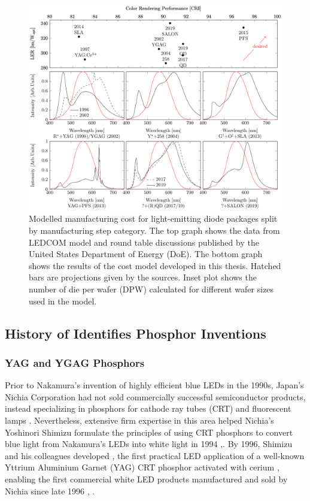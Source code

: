 \documentclass[10pt]{article}
\begin{document}
\begin{figure}[h]
	\centering
    \includegraphics[width=\textwidth]{2_SSL_EES/article/figures/phosphor_spectrum-comparison.pdf}
	\caption{Modelled manufacturing cost for light-emitting diode packages split by manufacturing step category. The top graph shows the data from LEDCOM model and round table discussions published by the United States Department of Energy (DoE). The bottom graph shows the results of the cost model developed in this thesis. Hatched bars are projections given by the sources. Inset plot shows the number of die per wafer (DPW) calculated for different wafer sizes used in the model.}
	\label{fig:phosphor_spectrum}
\end{figure}

\subsection{History of Identifies Phosphor Inventions}

\subsubsection{YAG and YGAG Phosphors}

Prior to Nakamura’s invention of highly efficient blue LEDs in the 1990s, Japan’s Nichia Corporation had not sold commercially successful semiconductor products, instead specializing in phosphors for cathode ray tubes (CRT) and fluorescent lamps \cite{nakamura2013blue}  . Nevertheless, extensive firm expertise in this area helped Nichia’s Yoshinori Shimizu formulate the principles of using CRT phosphors to convert blue light from Nakamura’s LEDs into white light in 1994 \cite{shimizu1994sheet},\cite{cho2017white}. By 1996, Shimizu and his colleagues developed \cite{bando1996}, \cite{shimizu1999light} the first practical LED application of a well-known Yttrium Aluminium Garnet (YAG) CRT phosphor activated with cerium \cite{blasse1967new}, enabling the first commercial white LED products manufactured and sold by Nichia since late 1996 \cite{bando1998development}, \cite{cho2017white}. 
\end{document}
